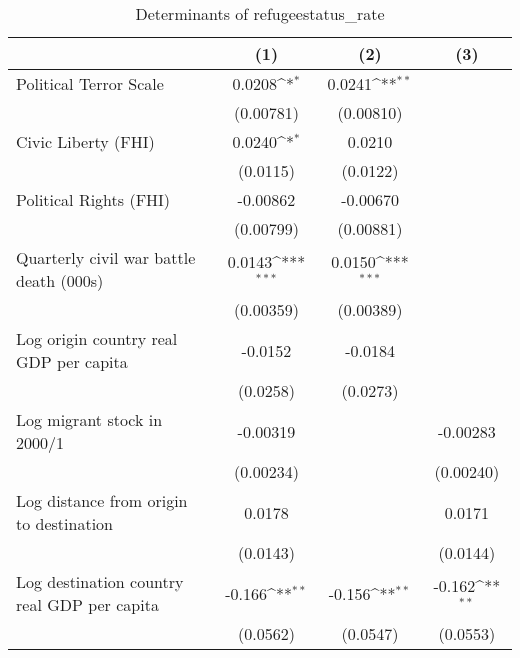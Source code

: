 \begin{table}[htbp]\centering
\def\sym#1{\ifmmode^{#1}\else\(^{#1}\)\fi}
\caption{Determinants of refugeestatus\_rate}
\begin{tabular}{l*{3}{c}}
\hline\hline
                    &\multicolumn{1}{c}{(1)}         &\multicolumn{1}{c}{(2)}         &\multicolumn{1}{c}{(3)}         \\
\hline
Political Terror Scale&      0.0208\sym{*}  &      0.0241\sym{**} &                     \\
                    &   (0.00781)         &   (0.00810)         &                     \\
[1em]
Civic Liberty (FHI) &      0.0240\sym{*}  &      0.0210         &                     \\
                    &    (0.0115)         &    (0.0122)         &                     \\
[1em]
Political Rights (FHI)&    -0.00862         &    -0.00670         &                     \\
                    &   (0.00799)         &   (0.00881)         &                     \\
[1em]
Quarterly civil war battle death (000s)&      0.0143\sym{***}&      0.0150\sym{***}&                     \\
                    &   (0.00359)         &   (0.00389)         &                     \\
[1em]
Log origin country real GDP per capita&     -0.0152         &     -0.0184         &                     \\
                    &    (0.0258)         &    (0.0273)         &                     \\
[1em]
Log migrant stock in 2000/1&    -0.00319         &                     &    -0.00283         \\
                    &   (0.00234)         &                     &   (0.00240)         \\
[1em]
Log distance from origin to destination&      0.0178         &                     &      0.0171         \\
                    &    (0.0143)         &                     &    (0.0144)         \\
[1em]
Log destination country real GDP per capita&      -0.166\sym{**} &      -0.156\sym{**} &      -0.162\sym{**} \\
                    &    (0.0562)         &    (0.0547)         &    (0.0553)         \\

\end{tabular}
\end{table}
